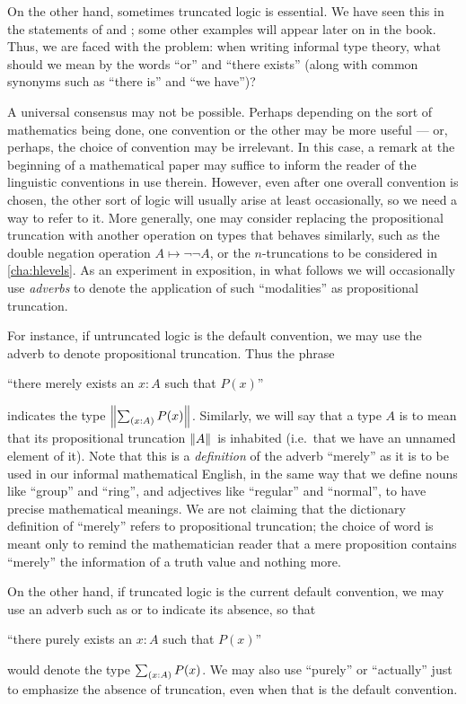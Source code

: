 On the other hand, sometimes truncated logic is essential.
We have seen this in the statements of \LEM{} and \choice{}; some other examples will appear later on in the book.
Thus, we are faced with the problem: when writing informal type theory, what should we mean by the words ``or'' and ``there exists'' (along with common synonyms such as ``there is'' and ``we have'')?

A universal consensus may not be possible.
Perhaps depending on the sort of mathematics being done, one convention or the other may be more useful --- or, perhaps, the choice of convention may be irrelevant.
In this case, a remark at the beginning of a mathematical paper may suffice to inform the reader of the linguistic conventions in use therein.
However, even after one overall convention is chosen, the other sort of logic will usually arise at least occasionally, so we need a way to refer to it.
More generally, one may consider replacing the propositional truncation with another operation on types that behaves similarly, such as the double negation operation $A\mapsto \neg\neg A$, or the $n$-truncations to be considered in \autoref{cha:hlevels}.
As an experiment in exposition,  in what follows we will occasionally use \emph{adverbs} to denote the application of such ``modalities'' as propositional truncation.

For instance, if untruncated logic is the default convention, we may use the adverb  to denote propositional truncation.
Thus the phrase
\begin{center}
  ``there merely exists an $x:A$ such that $P(x)$''
\end{center}
indicates the type $\brck{\sm{x:A} P(x)}$.
Similarly, we will say that a type $A$ is  to mean that its propositional truncation $\mathopen{}\left\Vert A\right\Vert_{}\mathclose{}$ is inhabited (i.e.\ that we have an unnamed element of it).
Note that this is a \emph{definition} of the adverb ``merely'' as it is to be used in our informal mathematical English, in the same way that we define nouns like ``group'' and ``ring'', and adjectives like ``regular'' and ``normal'', to have precise mathematical meanings.
We are not claiming that the dictionary definition of ``merely'' refers to propositional truncation; the choice of word is meant only to remind the mathematician reader that a mere proposition contains ``merely'' the information of a truth value and nothing more.

On the other hand, if truncated logic is the current default convention, we may use an adverb such as  or  to indicate its absence, so that
\begin{center}
``there purely exists an $x:A$ such that $P(x)$''
\end{center}
would denote the type $\sm{x:A} P(x)$.
We may also use ``purely'' or ``actually'' just to emphasize the absence of truncation, even when that is the default convention.

